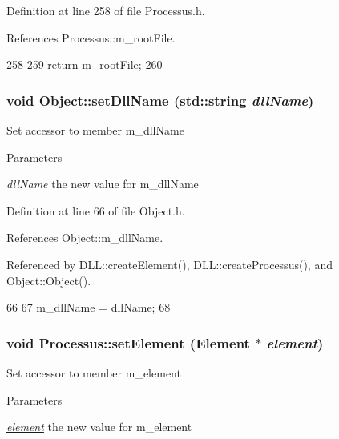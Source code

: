 Definition at line 258 of file Processus.h.

References Processus::m\_\-rootFile.


\begin{DoxyCode}
258                      {
259     return m_rootFile;
260   }
\end{DoxyCode}
\hypertarget{classObject_a870c5af919958c2136623b2d7816d123}{
\subsubsection[{setDllName}]{\setlength{\rightskip}{0pt plus 5cm}void Object::setDllName (std::string {\em dllName})}}
\label{classObject_a870c5af919958c2136623b2d7816d123}
Set accessor to member m\_\-dllName 
\begin{DoxyParams}{Parameters}
\item[{\em dllName}]the new value for m\_\-dllName \end{DoxyParams}


Definition at line 66 of file Object.h.

References Object::m\_\-dllName.

Referenced by DLL::createElement(), DLL::createProcessus(), and Object::Object().


\begin{DoxyCode}
66                                       {
67     m_dllName = dllName;
68   }
\end{DoxyCode}
\hypertarget{classProcessus_a8ddef94227d83d9dae2cd49aebc33353}{
\subsubsection[{setElement}]{\setlength{\rightskip}{0pt plus 5cm}void Processus::setElement ({\bf Element} $\ast$ {\em element})}}
\label{classProcessus_a8ddef94227d83d9dae2cd49aebc33353}
Set accessor to member m\_\-element 
\begin{DoxyParams}{Parameters}
\item[{\em \hyperlink{namespaceelement}{element}}]the new value for m\_\-element \end{DoxyParams}


